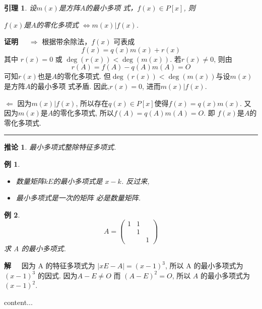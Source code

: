 \documentclass[13pt]{beamer}
\newtheorem{lem}{引理}
\newtheorem{exa}{例}
\newtheorem*{coro}{推论}
\def\qed{\nopagebreak\hfill{\rule{4pt}{7pt}}\medbreak}
\def\pf{{\bf 证明~~ }}
\def\sol{{\bf 解~~ }}
\begin{document}
\begin{frame}
\small{
\begin{lem}
	设$m(x)$是方阵$A$的最小多项
式，$f(x) \in P[x]$, 则
\begin{center}
$f(x)$是$A$的零化多项式 $\Leftrightarrow  m(x)|f(x)$.
\end{center}
\end{lem}
\pf 
$\Rightarrow$
根据带余除法，$f(x)$ 可表成
\[
f(x)=q(x) m(x)+r(x)
\]
其中 $r(x)=0$ 或 $\deg(r(x))<\deg \left(m(x)\right)$.
若$r(x)\neq 0$, 
则由$$r({A}) =f({A})-q({A}) m({A})={O}$$
可知$r(x)$也是$A$的零化多项式. 但$\deg(r(x))<\deg \left(m(x)\right)$与设$m(x)$是方阵$A$的最小多项
式矛盾. 因此,$r(x)=0$, 进而$m(x)|f(x)$.

$\Leftarrow$
 因为$m(x)|f(x)$, 所以存在$q(x) \in P[x]$使得$f(x)=q(x) m(x)$.
又因为$m(x)$是$A$的零化多项式, 所以$f(A)=q(A) m(A)={O}.$
即 $f(x)$是$A$的零化多项式.
\qed

\begin{coro}
最小多项式整除特征多项式. 
\end{coro}
}

\end{frame}


\begin{frame}
\begin{exa}
\begin{itemize}
\item 数量矩阵$kE$的最小多项式是
$x-k$.  反过来, 
\item 最小多项式是一次的矩阵
必是数量矩阵. 
\end{itemize}
\end{exa}


\begin{exa}
\[
{A}=\left(\begin{array}{ccc}
1 & 1 & \\
& 1 & \\
& & 1
\end{array}\right)
\]
求 A 的最小多项式.  
\end{exa}
\sol 
因为 A 的特征多项式为 $|x {E}-{A}|=(x-1)^{3}$,
所以 A 的最小多项式为$(x-1)^{3}$ 的因式.
因为$A-E \neq O$ 而 $({A}-{E})^{2}={O}$, 所以  ${A}$ 的最小多项式为 $(x-1)^{2}$.
\end{frame}


\begin{frame}
	content...
\end{frame}
\end{document}
